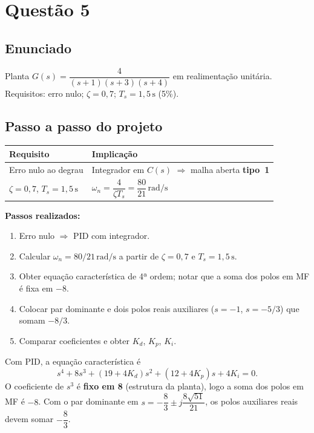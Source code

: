 \documentclass[11pt,a4paper]{article}
\begin{document}
\section*{Questão 5}

\subsection*{Enunciado}

Planta $G(s)=\dfrac{4}{(s+1)(s+3)(s+4)}$ em realimentação unitária.
Requisitos: erro nulo; $\zeta=0{,}7$; $T_s=1{,}5\,\mathrm{s}$ (5\%).

\subsection*{Passo a passo do projeto}

\begin{center}
\begin{tabular}{@{}ll@{}}
  \toprule
  Requisito & Implicação \\
  \midrule
  Erro nulo ao degrau & Integrador em $C(s)$ $\Rightarrow$ malha aberta \textbf{tipo~1} \\
  $\zeta=0{,}7$, $T_s=1{,}5\,\mathrm{s}$ &
  $\omega_n=\dfrac{4}{\zeta T_s}=\dfrac{80}{21}\,\mathrm{rad/s}$ \\
  \bottomrule
\end{tabular}
\end{center}

\textbf{Passos realizados:}
\begin{enumerate}[leftmargin=*]
  \item Erro nulo $\Rightarrow$ PID com integrador.
  \item Calcular $\omega_n=80/21\,\mathrm{rad/s}$ a partir de $\zeta=0{,}7$ e
        $T_s=1{,}5\,\mathrm{s}$.
  \item Obter equação característica de 4ª ordem; notar que a soma dos polos
        em MF é fixa em $-8$.
  \item Colocar par dominante e dois polos reais auxiliares ($s=-1$,
        $s=-5/3$) que somam $-8/3$.
  \item Comparar coeficientes e obter $K_d$, $K_p$, $K_i$.
\end{enumerate}

Com PID, a equação característica é
\[
  s^4+8s^3+(19+4K_d)s^2+(12+4K_p)s+4K_i=0.
\]
O coeficiente de $s^3$ é \textbf{fixo em 8} (estrutura da planta), logo a soma
dos polos em MF é $-8$. Com o par dominante em
$s=-\dfrac{8}{3}\pm j\dfrac{8\sqrt{51}}{21}$, os polos auxiliares reais devem
somar $-\dfrac{8}{3}$.
\end{document}
